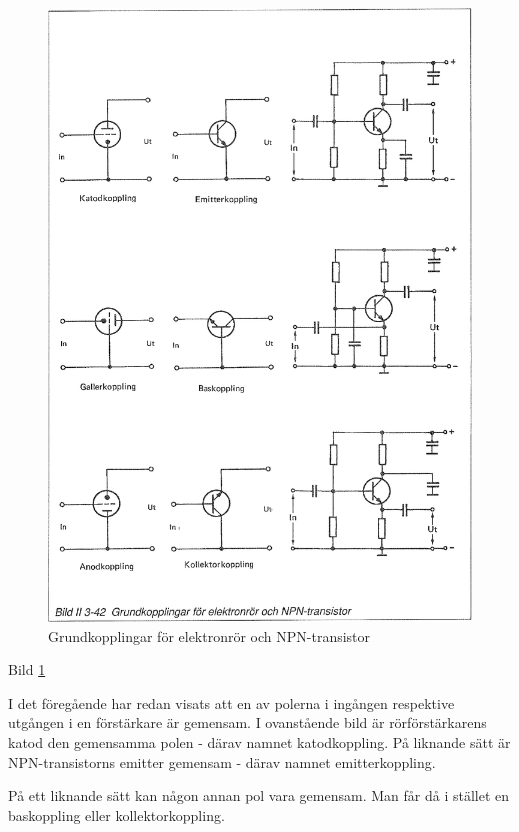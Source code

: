\begin{figure}[h]
\begin{center}
\includegraphics[width=14cm]{images/bild_2_3-42}
\caption{Grundkopplingar för elektronrör och NPN-transistor}
\label{fig:BildII3-42}
\end{center}
\end{figure}

Bild \ref{fig:BildII3-42}

I det föregående har redan visats att en av polerna i ingången
respektive utgången i en förstärkare är gemensam. I ovanstående bild
är rörförstärkarens katod den gemensamma polen - därav namnet
katodkoppling.  På liknande sätt är NPN-transistorns emitter gemensam
- därav namnet emitterkoppling.

På ett liknande sätt kan någon annan pol vara gemensam. Man får då i
stället en baskoppling eller kollektorkoppling.

